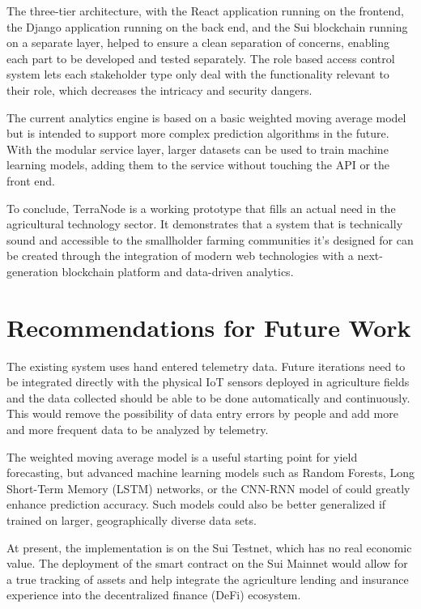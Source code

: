 The three-tier architecture, with the React application running on the frontend, the Django application running on the back end, and the Sui blockchain running on a separate layer, helped to ensure a clean separation of concerns, enabling each part to be developed and tested separately. The role based access control system lets each stakeholder type only deal with the functionality relevant to their role, which decreases the intricacy and security dangers.

The current analytics engine is based on a basic weighted moving average model but is intended to support more complex prediction algorithms in the future. With the modular service layer, larger datasets can be used to train machine learning models, adding them to the service without touching the API or the front end.

To conclude, TerraNode is a working prototype that fills an actual need in the agricultural technology sector. It demonstrates that a system that is technically sound and accessible to the smallholder farming communities it's designed for can be created through the integration of modern web technologies with a next-generation blockchain platform and data-driven analytics.

\section{Recommendations for Future Work}

The existing system uses hand entered telemetry data. Future iterations need to be integrated directly with the physical IoT sensors deployed in agriculture fields and the data collected should be able to be done automatically and continuously. This would remove the possibility of data entry errors by people and add more and more frequent data to be analyzed by telemetry.

The weighted moving average model is a useful starting point for yield forecasting, but advanced machine learning models such as Random Forests, Long Short-Term Memory (LSTM) networks, or the CNN-RNN model of \textcite{khaki2019cnn} could greatly enhance prediction accuracy. Such models could also be better generalized if trained on larger, geographically diverse data sets.

At present, the implementation is on the Sui Testnet, which has no real economic value. The deployment of the smart contract on the Sui Mainnet would allow for a true tracking of assets and help integrate the agriculture lending and insurance experience into the decentralized finance (DeFi) ecosystem.

